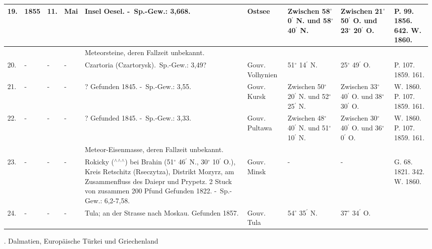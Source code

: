 \documentclass[a4paper, 11pt, oneside, polutonikogreek, german]{article}
\begin{document}
\begin{table}[!ht]
\begin{tabular}{|l|l|l|l|l|l|l|l|l|}
        19. & 1855 & 11. & Mai & Insel Oesel. - Sp.-Gew.: 3,668. & Ostsee & Zwischen 58$^\circ$ 0$^\prime$ N. und 58$^\circ$ 40$^\prime$ N. & Zwischen 21$^\circ$ 50$^\prime$ O. und 23$^\circ$ 20$^\prime$ O. & P. 99. 1856. 642. W. 1860. \\ \hline
          &   &   &   & Meteorsteine, deren Fallzeit unbekannt. &   &   &   &   \\ \hline
        20. & - & - & - & Czartoria (Czartorysk). Sp.-Gew.: 3,49? & Gouv. Volhynien & 51$^\circ$ 14$^\prime$ N. & 25$^\circ$ 49$^\prime$ O. & P. 107. 1859. 161. \\ \hline
        21. & - & - & - & ? Gefunden 1845. - Sp.-Gew.: 3,55. & Gouv. Kursk & Zwischen 50$^\circ$ 20$^\prime$ N. und 52$^\circ$ 25$^\prime$ N. & Zwischen 33$^\circ$ 40$^\prime$ O. und 38$^\circ$ 30$^\prime$ O. & W. 1860. P. 107. 1859. 161. \\ \hline
        22. & - & - & - & ? Gefunded 1845. - Sp.-Gew.: 3,33. & Gouv. Pultawa & Zwischen 48$^\circ$ 40$^\prime$ N. und 51$^\circ$ 10$^\prime$ N. & Zwischen 30$^\circ$ 40$^\prime$ O. und 36$^\circ$ 0$^\prime$ O. & W. 1860. P. 107. 1859. 161. \\ \hline
          &   &   &   & Meteor-Eisenmasse, deren Fallzeit unbekannt. &   &   &   &   \\ \hline
        23. & - & - & - & Rokicky ($^\wedge$$^\wedge$$^\wedge$) bei Brahin (51$^\circ$ 46$^\prime$ N., 30$^\circ$ 10$^\prime$ O.), Kreis Retschitz (Rseczytza), Distrikt Mozyrz, am Zusammenfluss des Daiepr und Prypetz. 2 Stuck von zusammen 200 Pfund Gefunden 1822. - Sp.-Gew.: 6,2-7,58. & Gouv. Minsk & - & - & G. 68. 1821. 342. W. 1860. \\ \hline
        24. & - & - & - & Tula; an der Strasse nach Moskau. Gefunden 1857. & Gouv. Tula & 54$^\circ$ 35$^\prime$ N. & 37$^\circ$ 34$^\prime$ O. \\ \hline
    \end{tabular}
\end{table}
. Dalmatien, Europäische Türkei und Griechenland
\end{document}
